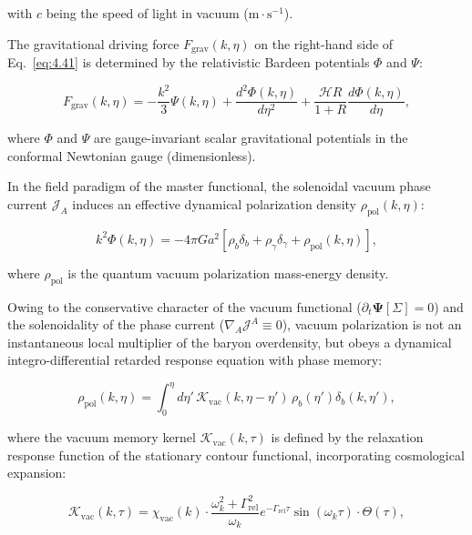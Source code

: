 with $c$ being the speed of light in vacuum ($\text{m}\cdot\text{s}^{-1}$).

The gravitational driving force $F_{\text{grav}}(k, \eta)$ on the right-hand side of Eq.~\eqref{eq:4.41} is determined by the relativistic Bardeen potentials $\Phi$ and $\Psi$:

\begin{equation}\label{eq:4.44}\tag{4.44}
F_{\text{grav}}(k, \eta) = - \frac{k^2}{3} \Psi(k, \eta) + \frac{d^2 \Phi(k, \eta)}{d\eta^2} + \frac{\mathcal{H} R}{1+R} \frac{d\Phi(k, \eta)}{d\eta},
\end{equation}

where $\Phi$ and $\Psi$ are gauge-invariant scalar gravitational potentials in the conformal Newtonian gauge (dimensionless).

In the field paradigm of the master functional, the solenoidal vacuum phase current $\mathcal{J}_A$ induces an effective dynamical polarization density $\rho_{\text{pol}}(k, \eta)$:

\begin{equation}\label{eq:4.45}\tag{4.45}
k^2 \Phi(k, \eta) = - 4\pi G a^2 \left[ \rho_b \delta_b + \rho_\gamma \delta_\gamma + \rho_{\text{pol}}(k, \eta) \right],
\end{equation}

where $\rho_{\text{pol}}$ is the quantum vacuum polarization mass-energy density.

Owing to the conservative character of the vacuum functional ($\partial_t \mathbf{\Psi}[\Sigma] = 0$) and the solenoidality of the phase current ($\nabla_A \mathcal{J}^A \equiv 0$), vacuum polarization is not an instantaneous local multiplier of the baryon overdensity, but obeys a dynamical integro-differential retarded response equation with phase memory:

\begin{equation}\label{eq:4.46}\tag{4.46}
\rho_{\text{pol}}(k, \eta) = \int_0^\eta d\eta' \, \mathcal{K}_{\text{vac}}(k, \eta - \eta') \, \rho_b(\eta') \delta_b(k, \eta'),
\end{equation}

where the vacuum memory kernel $\mathcal{K}_{\text{vac}}(k, \tau)$ is defined by the relaxation response function of the stationary contour functional, incorporating cosmological expansion:

\begin{equation}\label{eq:4.47}\tag{4.47}
\mathcal{K}_{\text{vac}}(k, \tau) = \chi_{\text{vac}}(k) \cdot \frac{\omega_k^2 + \Gamma_{\text{rel}}^2}{\omega_k} e^{-\Gamma_{\text{rel}} \tau} \sin(\omega_k \tau) \cdot \Theta(\tau),
\end{equation}

